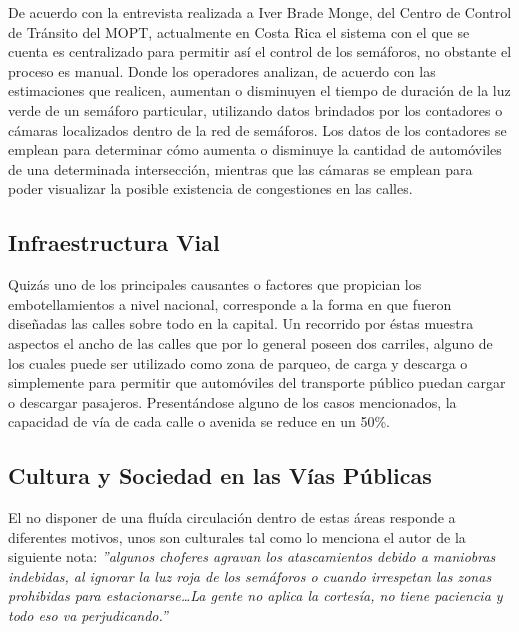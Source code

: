 \documentclass[12pt,journal,compsoc]{IEEEtran}
\begin{document}
		De acuerdo con la entrevista realizada a Iver Brade Monge, del Centro de
	Control de Tr\'{a}nsito del MOPT,  actualmente en Costa Rica el sistema con el que se cuenta es centralizado para permitir as\'{i} el control de los sem\'{a}foros, no obstante el proceso
	es manual. Donde los operadores analizan, de
	acuerdo con las estimaciones que realicen, aumentan o disminuyen el tiempo de duraci\'{o}n de la luz verde de un sem\'{a}foro particular, utilizando datos brindados por los contadores o c\'{a}maras localizados dentro de la red de sem\'{a}foros. Los datos de los contadores se emplean para determinar c\'omo aumenta o disminuye la cantidad de autom\'{o}viles de una determinada intersecci\'{o}n, mientras que las c\'{a}maras se emplean para poder visualizar la posible existencia de congestiones en las calles.

	\subsection{Infraestructura Vial}
	Quiz\'{a}s uno de los principales causantes o factores que propician los embotellamientos a nivel nacional, corresponde a la forma en que fueron dise\~{n}adas las calles sobre todo en la capital. Un recorrido por \'{e}stas muestra aspectos el ancho de las calles que por lo general poseen dos carriles, alguno de los cuales puede ser utilizado como zona de parqueo, de carga y descarga o simplemente para permitir que autom\'oviles del transporte p\'ublico puedan cargar o descargar pasajeros. Present\'{a}ndose alguno de los casos mencionados, la capacidad de v\'ia  de cada calle o avenida se reduce en un 50\%. 	
	
	\subsection{Cultura y Sociedad en las V\'{i}as P\'{u}blicas}
		El no disponer de una flu\'{i}da circulaci\'{o}n dentro de estas \'{a}reas
		responde a diferentes motivos, unos son culturales tal como lo menciona el autor de la siguiente
	nota: \textit{''algunos choferes agravan los atascamientos debido a
	maniobras indebidas, al ignorar la luz roja de los sem\'{a}foros o cuando irrespetan las
	zonas prohibidas para estacionarse\ldots La gente no aplica la cortes\'{i}a, no
	tiene paciencia y todo eso va perjudicando.''}
	\cite{Villegas2012}
	
\end{document}
